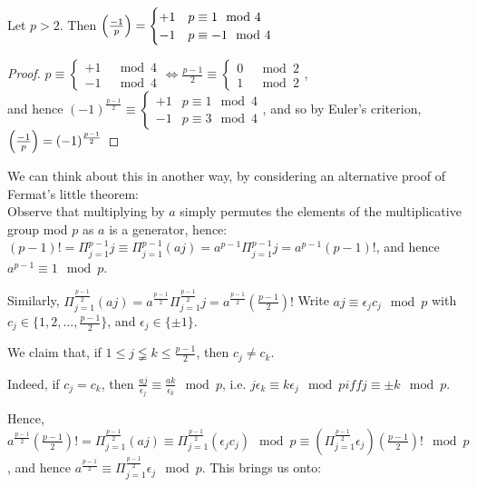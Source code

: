\documentclass[10pt,a4paper]{article}
\begin{document}
\begin{corollary}
Let $p > 2$. Then $\left(\frac{-1}{p}\right) = \begin{cases} +1 & p\equiv 1 \mod 4 \\ -1 & p\equiv -1 \mod 4\end{cases}$
\end{corollary}
\begin{proof}
$p \equiv \begin{cases} +1 & \mod 4 \\ -1 & \mod 4\end{cases} \iff \frac{p-1}{2} \equiv \begin{cases} 0 & \mod 2 \\ 1 & \mod 2\end{cases}$, \\and hence $(-1)^{\frac{p-1}{2}} \equiv \begin{cases} +1 & p\equiv 1 \mod 4\\ -1 &p\equiv 3 \mod 4\end{cases}$, and so by Euler's criterion, $\left(\frac{-1}{p}\right) = (-1)^{\frac{p-1}{2}}$
\end{proof}
We can think about this in another way, by considering an alternative proof of Fermat's little theorem:\\
Observe that multiplying by $a$ simply permutes the elements of the multiplicative group mod $p$ as $a$ is a generator, hence:\\
$(p-1)! = \Pi_{j=1}^{p-1} j \equiv \Pi_{j=1}^{p-1} (aj) = a^{p-1} \Pi_{j=1}^{p-1} j = a^{p-1}(p-1)!$, and hence $a^{p-1} \equiv 1 \mod p$.

Similarly, $\Pi_{j=1}^{\frac{p-1}{2}} (aj) = a^{\frac{p-1}{2}} \Pi_{j=1}^{\frac{p-1}{2}} j = a^{\frac{p-1}{2}}(\frac{p-1}{2})!$ Write $aj \equiv \epsilon_j c_j \mod p$ with $c_j \in \{1,2,\ldots, \frac{p-1}{2}\}$, and $\epsilon_j \in \{\pm 1\}$.

We claim that, if $1\leq j \lneqq k \leq \frac{p-1}{2}$, then $c_j \neq c_k$.

Indeed, if $c_j = c_k$, then $\frac{aj}{\epsilon_j}\equiv \frac{ak}{\epsilon_k} \mod p$, i.e. $j\epsilon_k \equiv k\epsilon_j \mod p iff j \equiv \pm k \mod p$.

Hence, $a^{\frac{p-1}{2}}(\frac{p-1}{2})! = \Pi_{j=1}^{\frac{p-1}{2}}(aj) \equiv \Pi_{j=1}^{\frac{p-1}{2}} (\epsilon_j c_j) \mod p \equiv \left(\Pi_{j=1}^{\frac{p-1}{2}} \epsilon_j\right)(\frac{p-1}{2})! \mod p$, and hence $a^{\frac{p-1}{2}} \equiv \Pi_{j=1}^{\frac{p-1}{2}} \epsilon_j \mod p$. This brings us onto:
\end{document}

